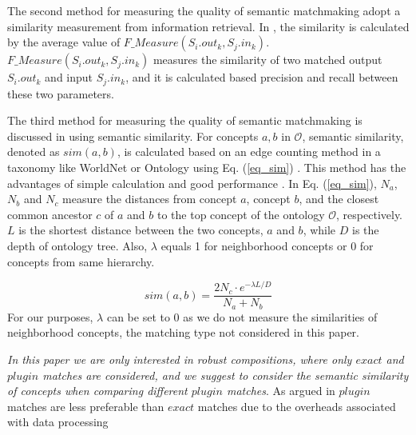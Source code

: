 The second method for measuring the quality of semantic matchmaking adopt a similarity measurement from information retrieval. In \cite{pop2009immune}, the similarity is calculated by the average value of $F\_Measure(S_i.out_k, S_j.in_k)$. $F\_Measure(S_i.out_k, S_j.in_k)$ measures the similarity of two matched output $S_i.out_k$ and input $S_j.in_k$, and it is calculated based precision and recall between these two parameters.


The third method for measuring the quality of semantic matchmaking is discussed in \cite{shet2012new} using semantic similarity. For concepts $a, b$ in $\mathcal{O}$, semantic similarity, denoted as $sim(a, b)$, is calculated based on an edge counting method in a taxonomy like WorldNet or Ontology using Eq. (\ref{eq_sim}) \cite{shet2012new}. This method has the advantages of simple calculation and good performance . In Eq. (\ref{eq_sim}), $N_a$, $N_b$ and $N_c$ measure the distances from concept $a$, concept $b$, and the closest common ancestor $c$ of $a$ and $b$ to the top concept of the ontology $\mathcal{O}$, respectively.  $L$ is the shortest distance between the two concepts, $a$ and $b$, while $D$ is the depth of ontology tree. Also, $\lambda$ equals 1 for neighborhood concepts or 0 for concepts from same hierarchy.

\begin{equation}
sim(a, b){=} \frac{2N_c \cdot e^{-\lambda L/D} }{N_{a}+N_{b}}
\label{eq_sim}
\end{equation}
\noindent For our purposes, $\lambda$ can be set to 0 as we do not measure the similarities of neighborhood concepts, the matching type not considered in this paper. 

\emph{In this paper we are only interested in robust compositions, where only $exact$ and $plugin$ matches are considered, and we suggest to consider the semantic similarity of concepts when comparing different $plugin$ matches}. As argued in \cite{lecue2009optimizing} $plugin$ matches are less preferable than $exact$ matches due to the overheads associated with data processing


